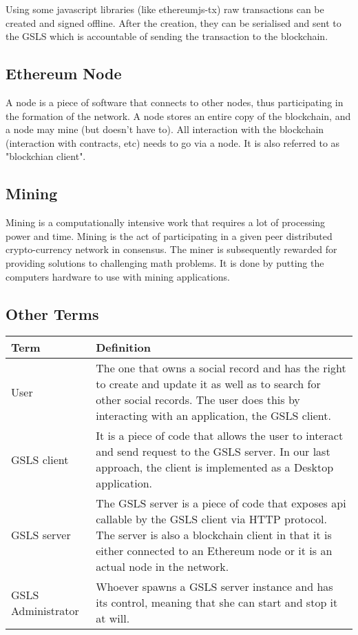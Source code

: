 Using some javascript libraries (like ethereumjs-tx) raw transactions can be created and signed offline. After the creation, they can be serialised and sent to the GSLS which is accountable of sending the transaction to the blockchain. 

\subsection*{Ethereum Node}
A node is a piece of software that connects to other nodes, thus participating in the formation of the network. A node stores an entire copy of the blockchain, and a node may mine (but doesn't have to). All interaction with the blockchain (interaction with contracts, etc) needs to go via a node. It is also referred to as "blockchian client". 

\subsection*{Mining}
Mining is a computationally intensive work that requires a lot of processing power and time. Mining is the act of participating in a given peer distributed crypto-currency network in consensus. The miner is subsequently rewarded for providing solutions to challenging math problems. It is done by putting the computers hardware to use with mining applications.

\subsection*{Other Terms}
\begin{center}
 \begin{tabular}{| l | p{10cm} |} 
 \hline
 \textbf{Term} & \textbf{Definition} \\
 \hline
User & The one that owns a social record and has the right to create and update it as well as to search for other social records. The user does this by interacting with an application, the GSLS client. \\ 
 \hline
 GSLS client & It is a piece of code that allows the user to interact and send request to the GSLS server. In our last approach, the client is implemented as a Desktop application. \\
 \hline
 GSLS server & The GSLS server is a piece of code that exposes api callable by the GSLS client via HTTP protocol. The server is also a blockchain client in that it is either connected to an Ethereum node or it is an actual node in the network. \\
 \hline
 GSLS Administrator & Whoever spawns a GSLS server instance and has its control, meaning that she can start and stop it at will. \\
 \hline
\end{tabular}
\end{center}

